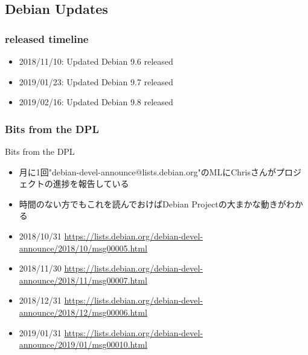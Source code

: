 \documentclass[mingoth,a4paper]{jsarticle}
\begin{document}

\subsection{Debian Updates}





\subsubsection{released timeline}


\begin{itemize}
  \item 2018/11/10:  Updated Debian 9.6  released
  \item 2019/01/23:  Updated Debian 9.7  released
  \item 2019/02/16:  Updated Debian 9.8  released
\end{itemize}




\subsubsection{Bits from the DPL}


Bits from the DPL

\begin{itemize}
\item 月に1回"debian-devel-announce@lists.debian.org"のMLにChrisさんがプロジェクトの進捗を報告している
\item 時間のない方でもこれを読んでおけばDebian Projectの大まかな動きがわかる
\end{itemize}

\small{
\begin{itemize}

\item 2018/10/31 \url{https://lists.debian.org/debian-devel-announce/2018/10/msg00005.html}
\item 2018/11/30 \url{https://lists.debian.org/debian-devel-announce/2018/11/msg00007.html}
\item 2018/12/31 \url{https://lists.debian.org/debian-devel-announce/2018/12/msg00006.html}
\item 2019/01/31 \url{https://lists.debian.org/debian-devel-announce/2019/01/msg00010.html}

\end{itemize}
}
\end{document}
